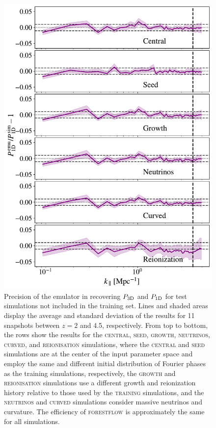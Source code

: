 \documentclass[fleqn,usenatbib]{mnras}
\newcommand{\poned}{\ensuremath{P_{\rm 1D}}\xspace}
\newcommand{\pthreed}{\ensuremath{P_{\rm 3D}}\xspace}
\newcommand{\forestflow}{\textsc{forestflow}\xspace}
\newcommand{\lacehc}{\textsc{training}\xspace}
\newcommand{\simseed}{\textsc{seed}\xspace}
\newcommand{\simigm}{\textsc{reionisation}\xspace}
\newcommand{\simcurved}{\textsc{curved}\xspace}
\newcommand{\simh}{\textsc{growth}\xspace}
\newcommand{\simnu}{\textsc{neutrinos}\xspace}
\newcommand{\simcentral}{\textsc{central}\xspace}
\begin{document}
\begin{figure}
\includegraphics[width= 0.96\columnwidth]{figures/test_cosmo_P1D.pdf}
\centering
\caption{Precision of the emulator in recovering \pthreed and \poned for test simulations not included in the training set. Lines and shaded areas display the average and standard deviation of the results for 11 snapshots between $z=2$ and 4.5, respectively. From top to bottom, the rows show the results for the \simcentral, \simseed, \simh, \simnu, \simcurved, and \simigm simulations, where the \simcentral and \simseed simulations are at the center of the input parameter space and employ the same and different initial distribution of Fourier phases as the training simulations, respectively, the \simh and \simigm simulations use a different growth and reionization history relative to those used by the \lacehc simulations, and the \simnu and \simcurved simulations consider massive neutrinos and curvature. The efficiency of \forestflow is approximately the same for all simulations.}
\label{fig:other_cosmo}
\end{figure}
\end{document}
